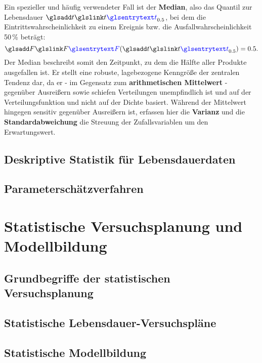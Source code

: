 Ein spezieller und häufig verwendeter Fall ist der \textbf{Median}, also das Quantil zur Lebensdauer $\sym{t}_{0.5}$, bei dem die Eintrittswahrscheinlichkeit zu einem Ereignis bzw. die Ausfallwahrscheinlichkeit 50\,\% beträgt:
\begin{equation} \label{eq:mediandef}
    \sym{F}(\sym{t}_{0.5}) = 0.5.
\end{equation}
Der Median beschreibt somit den Zeitpunkt, zu dem die Hälfte aller Produkte ausgefallen ist.
Er stellt eine robuste, lagebezogene Kenngröße der zentralen Tendenz dar, da er - im Gegensatz zum \textbf{arithmetischen Mittelwert} - gegenüber Ausreißern sowie schiefen Verteilungen unempfindlich ist und auf der Verteilungsfunktion und nicht auf der Dichte basiert.
Während der Mittelwert hingegen sensitiv gegenüber Ausreißern ist, erfassen hier die \textbf{Varianz} und die \textbf{Standardabweichung} die Streuung der Zufallsvariablen um den Erwartungswert.





\subsection{Deskriptive Statistik für Lebensdauerdaten} \label{subsec:stat}

\subsection{Parameterschätzverfahren} \label{subsec:schätzer}

\section{Statistische Versuchsplanung und Modellbildung} \label{sec:doe}

\subsection{Grundbegriffe der statistischen Versuchsplanung} \label{subsec:begriffedoe}

\subsection{Statistische Lebensdauer-Versuchspläne} \label{subsec:pläne}

\subsection{Statistische Modellbildung} \label{subsec:model}
